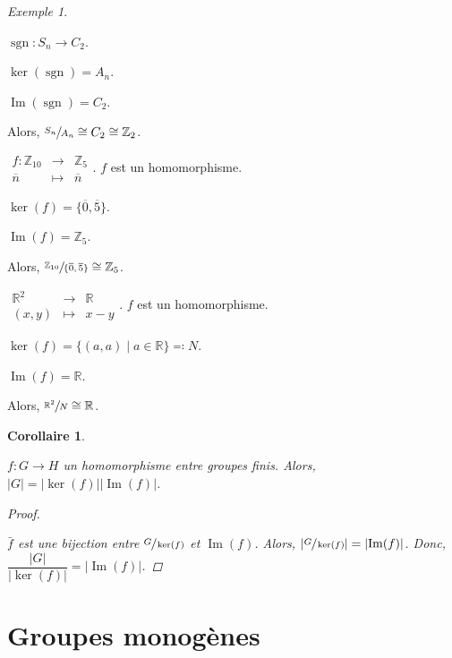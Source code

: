\documentclass{report}
\newcommand*{\card}[1]{\left| #1 \right|}
\newcommand*{\reels}{\mathbb{R}}
\newcommand*{\entiers}{\mathbb{Z}}
\newcommand*{\image}{\operatorname{Im}}
\newcommand*{\signe}{\operatorname{sgn}}
\newtheorem*{coro}{Corollaire}
\theoremstyle{definition}
\theoremstyle{remark}
\newtheorem*{exem}{Exemple}
\begin{document}
	\begin{exem}~

		\begin{ulist}
			\item $\signe:S_n \to C_2$.

			$\ker(\signe) = A_n$.

			$\image(\signe) = C_2$.

			Alors, $\sfrac{S_n}{A_n} \cong C_2 \cong \entiers_2$.
			\item $\begin{array}{rcl}
				f:\entiers_{10}&\to&\entiers_5\\
				\overline{n}&\mapsto&\overline{n}
			\end{array}$. $f$ est un homomorphisme.

			$\ker(f) = \{\overline0, \overline5\}$.

			$\image(f) = \entiers_5$.

			Alors, $\sfrac{\entiers_{10}}{\{\overline0,\overline5\}} \cong \entiers_5$.
			\item $\begin{array}{rcl}
				\reels^2&\to&\reels\\
				(x,y)&\mapsto&x-y
			\end{array}$. $f$ est un homomorphisme.

			$\ker(f) = \{(a,a) \mid a \in \reels\} \eqcolon N$.

			$\image(f) = \reels$.

			Alors, $\sfrac{\reels^2}{N} \cong \reels$.
		\end{ulist}
	\end{exem}

	
	\begin{coro}~

		$f:G \to H$ un homomorphisme entre groupes finis. Alors, $\card{G} = \card{\ker(f)} \card{\image(f)}$.
		\begin{proof}~

			$\bar{f}$ est une bijection entre $\sfrac{G}{\ker(f)}$ et $\image(f)$. Alors, $\card{\sfrac{G}{\ker(f)}} = \card{\image(f)}$. Donc, $\dfrac{\card{G}}{\card{\ker(f)}} = \card{\image(f)}$.
		\end{proof}
	\end{coro}

	\section*{Groupes monog\`enes}
\end{document}
